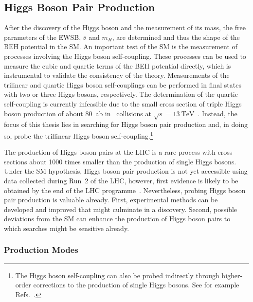 \subsection{Higgs Boson Pair Production}%
\label{fig:theory_higgs_pair_prod}


After the discovery of the Higgs boson and the measurement of its mass, the free
parameters of the EWSB, $\varv$ and $m_H$, are determined and thus the shape of
the BEH potential in the SM. An important test of the SM is the measurement of
processes involving the Higgs boson self-coupling. These processes can be used
to measure the cubic and quartic terms of the BEH potential directly, which is
instrumental to validate the consistency of the theory. Measurements of the
trilinear and quartic Higgs boson self-couplings can be performed in final
states with two or three Higgs bosons, respectively. The determination of the
quartic self-coupling is currently infeasible due to the small cross section of
triple Higgs boson production of about \SI{80}{\atto\barn} in \pp~collisions at
$\sqrt{s} = \SI{13}{\TeV}$~\cite{Maltoni:2014eza}. Instead, the focus of this
thesis lies in searching for Higgs boson pair production and, in doing so, probe
the trillinear Higgs boson self-coupling.\footnote{The Higgs boson self-coupling
  can also be probed indirectly through higher-order corrections to the
  production of single Higgs bosons. See for example
  Refs.~\cite{Degrassi:2016wml,ATLAS-CONF-2022-050}.}


The production of Higgs boson pairs at the LHC is a rare process with
cross sections about 1000 times smaller than the production of single Higgs
bosons. Under the SM hypothesis, Higgs boson pair production is not yet
accessible using data collected during Run~2 of the LHC, however, first evidence
is likely to be obtained by the end of the LHC
programme~\cite{ATL-PHYS-PUB-2022-005}. Nevertheless, probing Higgs boson pair
production is valuable already. First, experimental methods can be developed and
improved that might culminate in a discovery. Second, possible deviations from
the SM can enhance the production of Higgs boson pairs to which searches might
be sensitive already.


\subsubsection{Production Modes}%

